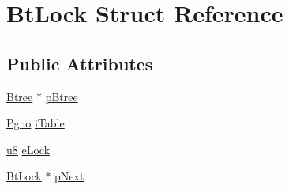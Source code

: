 \hypertarget{struct_bt_lock}{\section{Bt\-Lock Struct Reference}
\label{struct_bt_lock}
}
\subsection*{Public Attributes}
\begin{DoxyCompactItemize}
\item 
\hyperlink{struct_btree}{Btree} $\ast$ \hyperlink{struct_bt_lock_ab9125b8e79d480b75f3af21cb2ab55c7}{p\-Btree}
\item 
\hyperlink{sqlite3_8c_aec0c653e8dd16e4639caf2f8ea54f55c}{Pgno} \hyperlink{struct_bt_lock_a822efcf018d6c8eb343341cde5df980d}{i\-Table}
\item 
\hyperlink{sqlite3_8c_a74a0f6424ae628af25f23f0a35f6ead3}{u8} \hyperlink{struct_bt_lock_abe07b71018ee423e0d94b5cdba044b5c}{e\-Lock}
\item 
\hyperlink{struct_bt_lock}{Bt\-Lock} $\ast$ \hyperlink{struct_bt_lock_ad42de86209c7aab43604c52a549b7bca}{p\-Next}
\end{DoxyCompactItemize}


